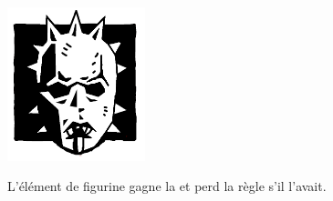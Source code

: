 \closearmyspecialrules





\newcommand{\logosize}{4cm}
\begin{multicols}{2}\raggedcolumns
\begin{center}
\includegraphics[width=\logosize]{pics/cultofnabh.png}
\armyspecialruleentry{\cultofnabh}

L'élément de figurine gagne la \hatred{} et perd la règle \killerinstinct{} s'il l'avait.
\end{center}


\end{multicols}
